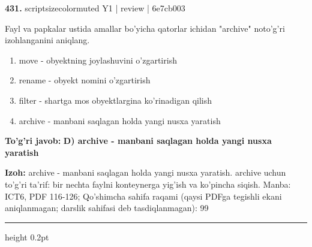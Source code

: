 \documentclass[10pt,a4paper]{article}
\begin{document}
{\bfseries\sffamily\color{ink} 431.} {scriptsizecolor{muted} Y1 | review | 6e7cb003}
\par
Fayl va papkalar ustida amallar bo'yicha qatorlar ichidan "archive" noto'g'ri izohlanganini aniqlang.
\begin{enumerate}[label=\Alph*),leftmargin=9mm]
\item move - obyektning joylashuvini o'zgartirish
\item rename - obyekt nomini o'zgartirish
\item filter - shartga mos obyektlargina ko'rinadigan qilish
\item archive - manbani saqlagan holda yangi nusxa yaratish
\end{enumerate}
\begin{tcolorbox}[enhanced,breakable,colback=teal!4,colframe=teal!60!black,boxrule=0.45pt,arc=1.2mm,left=2.7mm,right=2.7mm,top=1.8mm,bottom=1.8mm,before skip=2mm,after skip=2mm]
{\bfseries\sffamily\color{teal}To'g'ri javob:} \textbf{D) archive - manbani saqlagan holda yangi nusxa yaratish}
\par\smallskip
{\bfseries Izoh:} archive - manbani saqlagan holda yangi nusxa yaratish. archive uchun to'g'ri ta'rif: bir nechta faylni konteynerga yig'ish va ko'pincha siqish. Manba: ICT6, PDF 116-126; Qo'shimcha sahifa raqami (qaysi PDFga tegishli ekani aniqlanmagan; darslik sahifasi deb tasdiqlanmagan): 99
\end{tcolorbox}
\vspace{2mm}\hrule height 0.2pt\vspace{3mm}
\end{document}
